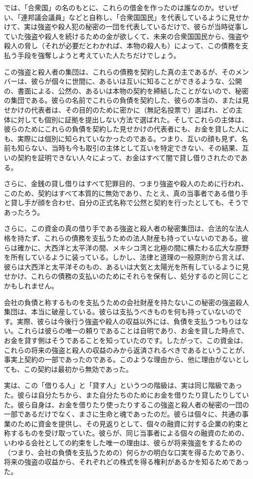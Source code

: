 \documentclass[dvipdfmx, uplatex, tate, landscape]{utbook}
\begin{document}
では、「合衆国」の名のもとに、これらの借金を作ったのは誰なのか。せいぜい、「連邦議会議員」などと自称し、「合衆国国民」を代表しているように見せかけて、実は強盗や殺人犯の秘密の一団を代表しているだけで、彼らが当時従事していた強盗や殺人を続けるための金が欲しくて、未来の合衆国国民から、強盗や殺人の脅し（それが必要だとわかれば、本物の殺人も）によって、この債務を支払う手段を強奪しようと考えていた人たちだけでしょう。

この強盗と殺人者の集団は、これらの債務を契約した真の主であるが、そのメンバーは、彼らが個々に世間に、あるいは互いに知ることができるような、公開の、書面による、公然の、あるいは本物の契約を締結したことがないので、秘密の集団である。彼らの名前でこれらの負債を契約した、彼らの本当の、または見せかけの代表者は、その目的のために密かに（無記名投票で）選ばれ、どの主体に対しても個別に証拠を提出しない方法で選ばれた。そしてこれらの主体は、彼らのためにこれらの負債を契約した見せかけの代表者にも、お金を貸した人にも、実際には個別に知られていなかったのである。つまり、互いの顔も見ず、名前も知らない、当時も今も取引の主体として互いを特定できない、その結果、互いの契約を証明できない人々によって、お金はすべて闇で貸し借りされたのである。

さらに、金銭の貸し借りはすべて犯罪目的、つまり強盗や殺人のために行われ、このため、契約はすべて本質的に無効であり、たとえ、真の当事者である借り手と貸し手が顔を合わせ、自分の正式名称で公然と契約を行ったとしても、そうであったろう。

さらに、この資金の真の借り手である強盗と殺人者の秘密集団は、合法的な法人格を持たず、これらの債務を支払うための法人財産も持っていないのである。彼らは確かに、大西洋と太平洋の間、メキシコ湾と北極の間に横たわる広大な原野を所有しているように装っている。しかし、法律と道理の一般原則から言えば、彼らは大西洋と太平洋そのもの、あるいは大気と太陽光を所有しているように見せかけ、これらの債務の支払いのためにそれらを保有し、処分するのと同じことかもしれません。

会社の負債と称するものを支払うための会社財産を持たないこの秘密の強盗殺人集団は、本当に破産している。彼らは支払うべきものを何も持っていないのです。実際、彼らは今後行う強盗や殺人の収益以外には、負債を支払うつもりはない。これらは彼らの唯一の頼りであることは自明であり、お金を貸した時点で、お金を貸す側はそうであることを知っていたのです。したがって、この資金は、これらの将来の強盗と殺人の収益のみから返済されるべきであるということが、事実上契約の一部であったのである。このような理由から、他に理由がないとしても、この契約は最初から無効であった。

実は、この「借りる人」と「貸す人」というつの階級は、実は同じ階級であった。彼らは自分たちから、また自分たちのためにお金を借りたり貸したりしていた。彼ら自身は、お金を借りたり使ったりするこの強盗と殺人者の秘密の一団の一部であるだけでなく、まさに生命と魂であったのだ。彼らは個々に、共通の事業のために資金を提供し、その見返りとして、個々の融資に対する企業の約束と称するものを受け取っていた。彼らが、同じ当事者による個々の融資のための、いわゆる会社としての約束をした唯一の理由は、彼らが将来強盗をするための（つまり、会社の負債を支払うための）何らかの明白な口実を得るためであり、将来の強盗の収益から、それぞれどの株式を得る権利があるかを知るためであった。
\end{document}

